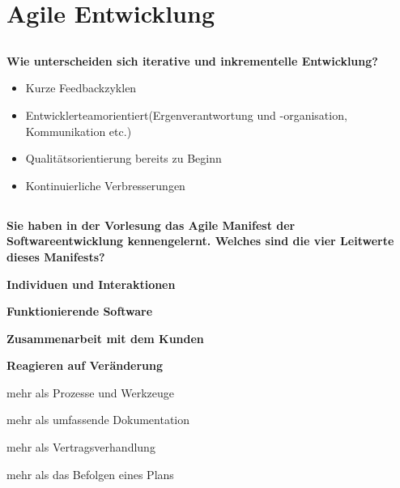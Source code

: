\section{Agile Entwicklung}
\subsection{}
\textbf{Wie unterscheiden sich iterative und inkrementelle Entwicklung?}
\begin{itemize}
    \item Kurze Feedbackzyklen
    \item Entwicklerteamorientiert(Ergenverantwortung und -organisation, Kommunikation etc.)
    \item Qualitätsorientierung bereits zu Beginn
    \item Kontinuierliche Verbresserungen
\end{itemize}

\subsection{}
\textbf{Sie haben in der Vorlesung das Agile Manifest der Softwareentwicklung kennengelernt. Welches sind die vier Leitwerte dieses Manifests?}

\begin{center}
    \begin{minipage}{.48\linewidth}
        \begin{flushright}
            \textbf{Individuen und Interaktionen}

            \textbf{Funktionierende Software}

            \textbf{Zusammenarbeit mit dem Kunden}

            \textbf{Reagieren auf Veränderung}
        \end{flushright}
    \end{minipage}
    \begin{minipage}{.48\linewidth}
        \begin{flushleft}
            mehr als Prozesse und Werkzeuge

            mehr als umfassende Dokumentation

            mehr als Vertragsverhandlung

            mehr als das Befolgen eines Plans
        \end{flushleft}
    \end{minipage}
\end{center}


